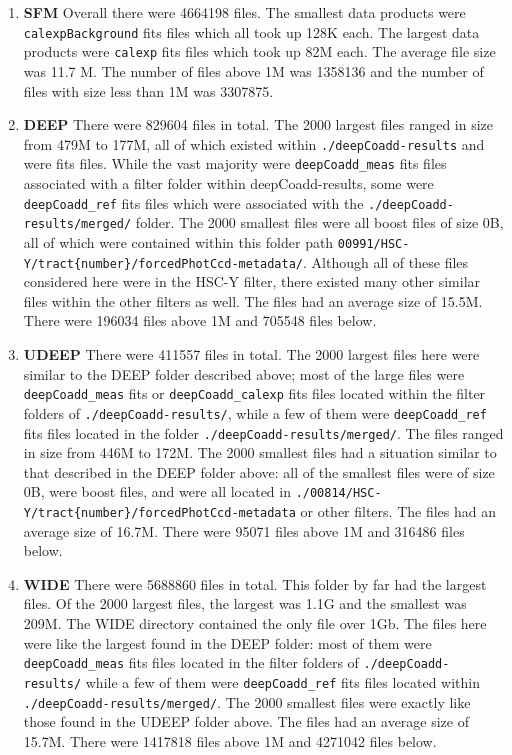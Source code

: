 \documentclass[DM,authoryear,toc]{lsstdoc}
\begin{document}
\begin{enumerate}
\item
\textbf{SFM}
Overall there were 4664198 files.
The smallest data products were \texttt{calexpBackground} fits files which all took up 128K each.
The largest data products were \texttt{calexp} fits files which took up 82M each.
The average file size was 11.7 M. The number of files above 1M was 1358136 and the number of files with size less than 1M was 3307875.
\item
\textbf{DEEP}
There were 829604 files in total.
The 2000 largest files ranged in size from 479M to 177M, all of which existed within \texttt{./deepCoadd-results} and were fits files. While the vast majority were \texttt{deepCoadd{\_}meas} fits files associated with a filter folder within deepCoadd-results, some were \texttt{deepCoadd{\_}ref} fits files which were associated with the \texttt{./deepCoadd-results/merged/} folder.
The 2000 smallest files were all boost files of size 0B, all of which were contained within this folder path \texttt{00991/HSC-Y/tract\{number\}/forcedPhotCcd-metadata/}.
Although all of these files considered here were in the HSC-Y filter, there existed many other similar files within the other filters as well.
The files had an average size of 15.5M. There were 196034 files above 1M and 705548 files below.
\item
\textbf{UDEEP}
There were 411557 files in total.
The 2000 largest files here were similar to the DEEP folder described above; most of the large files were \texttt{deepCoadd{\_}meas} fits or \texttt{deepCoadd{\_}calexp} fits files located within the filter folders of \texttt{./deepCoadd-results/}, while a few of them were \texttt{deepCoadd{\_}ref} fits files located in the folder \texttt{./deepCoadd-results/merged/}.
The files ranged in size from 446M to 172M.
The 2000 smallest files had a situation similar to that described in the DEEP folder above: all of the smallest files were of size 0B, were boost files, and were all located in \texttt{./00814/HSC-Y/tract\{number\}/forcedPhotCcd-metadata} or other filters.
The files had an average size of 16.7M. There were 95071 files above 1M and 316486 files below.
\item
\textbf{WIDE}
There were 5688860 files in total.
This folder by far had the largest files. Of the 2000 largest files, the largest was 1.1G and the smallest was 209M. The WIDE directory contained the only file over 1Gb. The files here were like the largest found in the DEEP folder: most of them were \texttt{deepCoadd{\_}meas} fits files located in the filter folders of \texttt{./deepCoadd-results/} while a few of them were \texttt{deepCoadd{\_}ref} fits files located within \texttt{./deepCoadd-results/merged/}.
The 2000 smallest files were exactly like those found in the UDEEP folder above.
The files had an average size of 15.7M. There were 1417818 files above 1M and 4271042 files below.
\end{enumerate}
\end{document}

